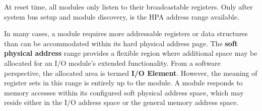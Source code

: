 At reset time, all modules only listen to their broadcastable registers. Only after system bus setup and module discovery, is the HPA address range available.


In many cases, a module requires more addressable registers or data structures than can be  
accommodated within its hard physical address page. The \textbf{soft physical address} range provides a flexible region where additional space may be allocated for an I/O module’s extended functionality. From a software perspective, the allocated area is termed \textbf{I/O Element}. However, the meaning of register sets in this range is entirely up to the module. A module responds to memory accesses within its configured soft physical address space, which may reside  either in the I/O address space or the general memory address space.

